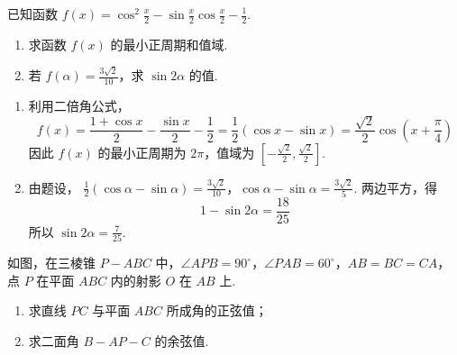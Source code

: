 \begin{problem}
已知函数 \( f(x) = \cos^2\frac{x}{2} - \sin \frac{x}{2}\cos \frac{x}{2} - \frac{1}{2} \).
\begin{enumerate}
\item 求函数 \( f(x) \) 的最小正周期和值域.
\item 若 \( f(\alpha)=\frac{3\sqrt{2}}{10} \)，求 \( \sin 2\alpha \) 的值.
\end{enumerate}
\end{problem}

\begin{solution}
\begin{enumerate}
\item 利用二倍角公式，
\[
f(x)=\frac{1+\cos x}{2}-\frac{\sin x}{2}-\frac12
=\frac12(\cos x-\sin x)
=\frac{\sqrt2}{2}\cos\left(x+\frac\pi4\right)
\]
因此 \(f(x)\) 的最小正周期为 \(2\pi\)，值域为 \(\left[-\frac{\sqrt2}{2},\frac{\sqrt2}{2}\right]\).
\item 由题设，
\(\frac12(\cos\alpha-\sin\alpha)=\frac{3\sqrt2}{10}\)，\(\cos\alpha-\sin\alpha=\frac{3\sqrt2}{5}\).
两边平方，得
\[
1-\sin2\alpha=\frac{18}{25}
\]
所以 \(\sin2\alpha=\frac7{25}\).
\end{enumerate}
\end{solution}

\begin{problem}
如图，在三棱锥 \(P - ABC\) 中，\(\angle APB = 90^{\circ}\)，\(\angle PAB = 60^{\circ}\)，\(AB = BC = CA\)，点 \(P\) 在平面 \(ABC\) 内的射影 \(O\) 在 \(AB\) 上.
\begin{enumerate}
\item 求直线 \(PC\) 与平面 \(ABC\) 所成角的正弦值；
\item 求二面角 \(B - AP - C\) 的余弦值.
\end{enumerate}
\end{problem}

